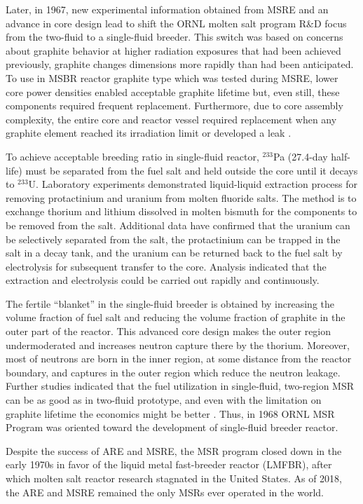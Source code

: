 Later, in 1967, new experimental information obtained from \gls{MSRE} and an advance in core design lead to shift the \gls{ORNL} molten salt program R\&D focus from the two-fluid to a single-fluid breeder. This switch was based on concerns about graphite behavior at higher radiation exposures that had been achieved previously, graphite changes dimensions more rapidly than had been anticipated. To use in \gls{MSBR} reactor graphite type which was tested during \gls{MSRE}, lower core power densities enabled acceptable graphite lifetime but, even still, these components required frequent replacement. Furthermore, due to core assembly complexity, the entire core and reactor vessel required replacement when any graphite element reached its irradiation limit or developed a leak \cite{rosenthal_molten-salt_1970}.

To achieve acceptable breeding ratio in single-fluid reactor, $^{233}$Pa (27.4-day half-life) must be separated from the fuel salt and held outside the core until it decays to $^{233}$U. Laboratory experiments demonstrated liquid-liquid extraction process for removing protactinium and uranium from molten fluoride salts. The method is to exchange thorium and lithium dissolved in molten bismuth for the components to be removed from the salt. Additional data have confirmed that the uranium can be selectively separated from the salt, the protactinium can be trapped in the salt in a decay tank, and the uranium can be returned back to the fuel salt by electrolysis for subsequent transfer to the core. Analysis indicated that the extraction and electrolysis could be carried out rapidly and continuously.

The fertile ``blanket'' in the single-fluid breeder is obtained by increasing the volume fraction of fuel salt and reducing the volume fraction of graphite in the outer part of the reactor. This advanced core design makes the outer region undermoderated and increases neutron capture there by the thorium. Moreover, most of neutrons are born in the inner region, at some distance from the reactor boundary, and captures in the outer region which reduce the neutron leakage. Further studies indicated that the fuel utilization in single-fluid, two-region \gls{MSR} can be as good as in two-fluid prototype, and even with the limitation on graphite lifetime the economics might be better \cite{rosenthal_molten-salt_1970}. Thus, in 1968 \gls{ORNL} \gls{MSR} Program was oriented toward the development of single-fluid breeder reactor.

Despite the success of \gls{ARE} and \gls{MSRE}, the \gls{MSR} program closed down in the early 1970s in favor of the liquid metal fast-breeder reactor (LMFBR),\cite{macpherson_molten_1985} after which molten salt reactor research stagnated in the United States. As of 2018, the \gls{ARE} and \gls{MSRE} remained the only \glspl{MSR} ever operated in the world.

